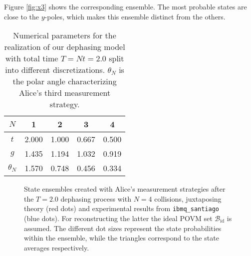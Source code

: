 \documentclass[aps,pra,twocolumn,superscriptaddress,showemail,showpacs,longbibliography]{revtex4-2}
\begin{document}
Figure \ref{fig:x3} shows the corresponding ensemble. The most probable states are close to the $y$-poles, which makes this ensemble distinct from the others.

\begin{table}[ht]
    \centering
    \begin{tabular}{c|cccc}
        $N$ & 1 & 2 & 3 & 4 \\
        \hline
        $t$ & 2.000 & 1.000 & 0.667 & 0.500 \\
        $g$ & 1.435 & 1.194 & 1.032 & 0.919 \\
        \hline
        $\theta_N$ & 1.570 & 0.748 & 0.456 & 0.334\\
    \end{tabular}
    \caption{Numerical parameters for the realization of our dephasing model with total time $T= Nt = 2.0$ split into different discretizations. $\theta_N$ is the polar angle characterizing Alice's third measurement strategy.}
    \label{tab:parameters}
\end{table}

\begin{figure*}[ht]
    \centering
    \hfill
    \hfill
    \caption{State ensembles created with Alice's measurement strategies after the $T=2.0$ dephasing process with $N=4$ collisions, juxtaposing theory (red dots) and experimental results from \texttt{ibmq\_santiago} (blue dots). For reconstructing the latter the ideal POVM set $\mathcal{B}_\text{id}$ is assumed. The different dot sizes represent the state probabilities within the ensemble, while the triangles correspond to the state averages respectively.}
    \label{fig:ensembles}
\end{figure*}
\end{document}
